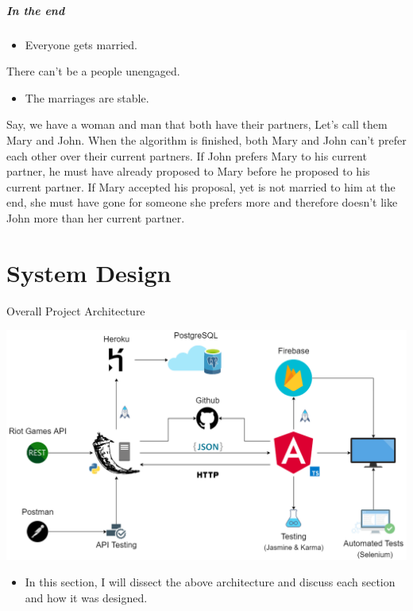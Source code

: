\paragraph{In the end}
\begin{itemize}
	\item Everyone gets married.
\end{itemize}
There can't be a people unengaged.\newline 
\begin{itemize}
	\item The marriages are stable.
\end{itemize}
Say, we have a woman and man that both have their partners, Let's call them Mary and John.
When the algorithm is finished, both Mary and John can't prefer each other over their current partners. If John prefers Mary to his current partner, he must have already proposed to Mary before he proposed to his current partner. If Mary accepted his proposal, yet is not married to him at the end, she must have gone for someone she prefers more and therefore doesn't like John more than her current partner. 

\chapter{System Design}
Overall Project Architecture
\begin{center}    
	\includegraphics[width=\textwidth,height=\textheight,keepaspectratio]{img/Architecture.png}
\end{center}
\begin{itemize}
	\item In this section, I will dissect the above architecture and discuss each section and how it was designed.
\end{itemize}

